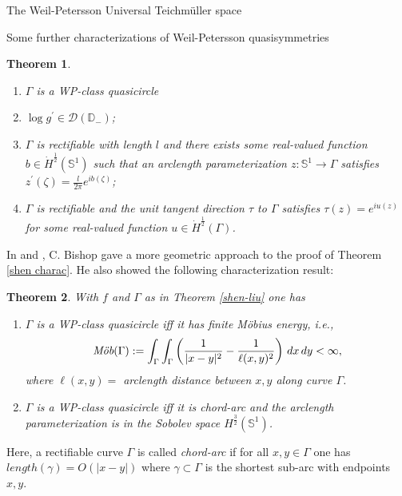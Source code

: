 \documentclass[12pt]{amsart}
\theoremstyle{plain}
\newtheorem{theorem}{Theorem}[section]
\theoremstyle{definition}
\theoremstyle{remark}
\numberwithin{equation}{section} %
\numberwithin{figure}{section} %
\begin{document}
\begin{section}{The Weil-Petersson Universal Teichm\"uller space}
\begin{subsection}{Some further characterizations of Weil-Petersson quasisymmetries}
\begin{theorem}
\begin{enumerate}[font=\upshape]
    \item \(\Gamma\) is a \emph{WP}-class quasicircle
\item  \(\log g^{\prime} \in \mathcal{D}\left(\mathbb{D}_{-}\right)\);
\item  \(\Gamma\) is rectifiable with length \(l\) and there exists some real-valued function \(b \in \dot{H}^{\frac{1}{2}}\left(\mathbb{S}^{1}\right)\) such
that an arclength parameterization \(z: \mathbb{S}^{1} \rightarrow \Gamma\) satisfies \(z^{\prime}(\zeta)=\frac{l}{2 \pi} e^{i b(\zeta)}\);
\item \(\Gamma\) is rectifiable and the unit tangent direction \(\tau\) to \(\Gamma\) satisfies \(\tau(z)=e^{i u(z)}\) for some
real-valued function \(u \in\dot{H}^{\frac{1}{2}}(\Gamma)\).
\end{enumerate}

\end{theorem}

In \cite{Bishop1} and \cite{Bishop2}, C. Bishop gave a more geometric approach to the proof of Theorem \ref{shen charac}. He also showed the following characterization result:
\begin{theorem}
 With \(f\) and $\Gamma$ as in \emph{Theorem \ref{shen-liu}} one has
\begin{enumerate}[font=\upshape]
    \item \(\Gamma\) is a \emph{WP}-class quasicircle iff it has finite M\"obius energy, i.e.,
\begin{equation}
    \emph{Möb}(\Gamma):=\int_{\Gamma} \int_{\Gamma}\left(\frac{1}{|x-y|^{2}}-\frac{1}{\ell(x, y)^{2}}\right)\, d x \, d y<\infty, 
\end{equation}
where \(\ell(x, y)=\) arclength distance between \(x, y\) along curve $\Gamma$.

\item \(\Gamma\) is a \emph{WP}-class quasicircle iff it is chord-arc and the arclength parameterization is in the Sobolev space \(H^{\frac{3}{2}}(\mathbb{S}^1)\).

\end{enumerate}

\end{theorem}
Here, a rectifiable curve \(\Gamma\) is called {\it chord-arc} if for all \(x, y \in \Gamma\) one has  \(length(\gamma)=O(|x-y|)\)
where \(\gamma \subset \Gamma\) is the shortest sub-arc with endpoints \(x, y\).\\ 



\end{subsection}
\end{section}
\end{document}
